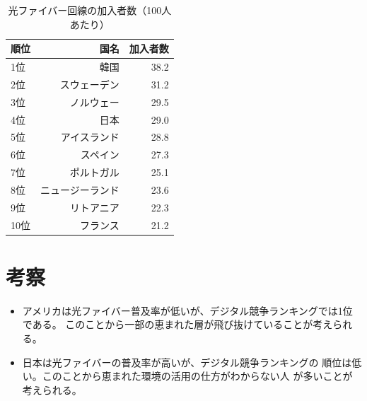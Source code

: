 \documentclass[a4paper,11pt,dvipdfmx]{ujarticle}
\begin{document}
\begin{table}[htbp]
    \centering
    \caption{光ファイバー回線の加入者数（100人あたり）}
    \label{tbl:利用状況}

    \begin{tabular}{|l|r|r|}\hline
        順位 & 国名 & 加入者数 \\
        \hline
        1位 & 韓国 & 38.2 \\
        \hline
        2位 & スウェーデン & 31.2 \\
        \hline
        3位 & ノルウェー & 29.5 \\
        \hline
        4位 & 日本 & 29.0 \\
        \hline
        5位 & アイスランド & 28.8 \\
        \hline
        6位 & スペイン & 27.3 \\
        \hline 
        7位 & ポルトガル & 25.1 \\
        \hline
         8位 & ニュージーランド & 23.6 \\
        \hline
         9位 & リトアニア & 22.3 \\
        \hline
         10位 & フランス & 21.2 \\
        \hline
    \end{tabular}
\end{table}
\section{考察}
\begin{itemize}
    \item  アメリカは光ファイバー普及率が低いが、デジタル競争ランキングでは1位である。
このことから一部の恵まれた層が飛び抜けていることが考えられる。
    \item  日本は光ファイバーの普及率が高いが、デジタル競争ランキングの
順位は低い。このことから恵まれた環境の活用の仕方がわからない人
が多いことが考えられる。
\end{itemize}

%

%


\end{document}
